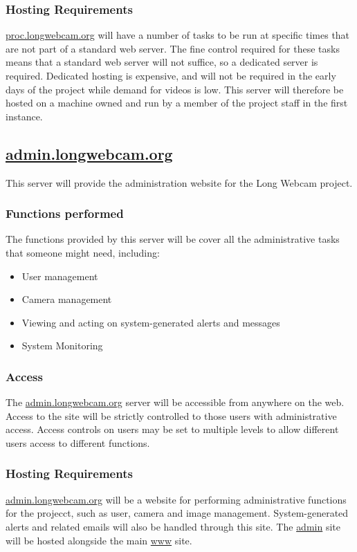 \documentclass[11pt]{article}
\begin{document}
\subsubsection{Hosting Requirements}
\url{proc.longwebcam.org} will have a number of tasks to be run at specific times that are not part of a standard web server. The fine control required for these tasks means that a standard web server will not suffice, so a dedicated server is required. Dedicated hosting is expensive, and will not be required in the early days of the project while demand for videos is low. This server will therefore be hosted on a machine owned and run by a member of the project staff in the first instance.

\subsection{\protect\url{admin.longwebcam.org}}

This server will provide the administration website for the Long Webcam project.

\subsubsection{Functions performed}

The functions provided by this server will be cover all the administrative tasks that someone might need, including:

\begin{itemize}
    \item User management
    \item Camera management
    \item Viewing and acting on system-generated alerts and messages
    \item System Monitoring
\end{itemize}

\subsubsection{Access}
The \url{admin.longwebcam.org} server will be accessible from anywhere on the web. Access to the site will be strictly controlled to those users with administrative access. Access controls on users may be set to multiple levels to allow different users access to different functions.

\subsubsection{Hosting Requirements}
\url{admin.longwebcam.org} will be a website for performing administrative functions for the projecct, such as user, camera and image management. System-generated alerts and related emails will also be handled through this site. The \url{admin} site will be hosted alongside the main \url{www} site.
\end{document}
